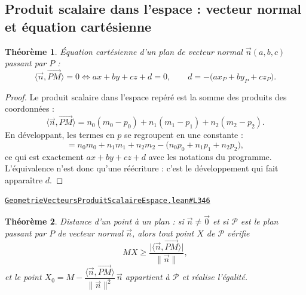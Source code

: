 \documentclass[11pt,a4paper]{article}
\theoremstyle{definition}
\theoremstyle{plain}
\newtheorem{theoreme}{Théorème}
\newcommand{\source}[2]{\par\smallskip\noindent\hfill{\footnotesize\href{#1}{\texttt{#2}}}\par\smallskip}
\begin{document}
\subsection{Produit scalaire dans l'espace : vecteur normal et équation cartésienne}

\begin{theoreme}
Équation cartésienne d'un plan de vecteur normal $\vec n(a, b, c)$ passant par $P$ :
\[ \langle \vec n, \overrightarrow{PM}\rangle = 0
   \iff a x + b y + c z + d = 0 ,
   \qquad d = -\bigl(a x_P + b y_P + c z_P\bigr) . \]
\end{theoreme}

\begin{proof}
Le produit scalaire dans l'espace repéré est la somme des produits des coordonnées :
\[ \langle \vec n, \overrightarrow{PM}\rangle
   = n_0 (m_0 - p_0) + n_1 (m_1 - p_1) + n_2 (m_2 - p_2) . \]
En développant, les termes en $p$ se regroupent en une constante :
\[ = n_0 m_0 + n_1 m_1 + n_2 m_2 - \bigl(n_0 p_0 + n_1 p_1 + n_2 p_2\bigr) , \]
ce qui est exactement $ax + by + cz + d$ avec les notations du programme. L'équivalence
n'est donc qu'une réécriture : c'est le développement qui fait apparaître $d$.
\end{proof}
\source{https://github.com/Commutator-IO/learn-lean/blob/main/cours/02-lycee/08-geometrie-vecteurs-produit-scalaire-espace/GeometrieVecteursProduitScalaireEspace.lean\#L346}{GeometrieVecteursProduitScalaireEspace.lean\#L346}

\begin{theoreme}
Distance d'un point à un plan : si $\vec n \ne \vec 0$ et si $\mathcal{P}$ est le plan
passant par $P$ de vecteur normal $\vec n$, alors tout point $X$ de $\mathcal{P}$ vérifie
\[ MX \ge \frac{\bigl|\langle \vec n, \overrightarrow{PM}\rangle\bigr|}{\|\vec n\|} , \]
et le point
$X_0 = M - \dfrac{\langle \vec n, \overrightarrow{PM}\rangle}{\|\vec n\|^{2}}\,\vec n$
appartient à $\mathcal{P}$ et réalise l'égalité.
\end{theoreme}
\end{document}
